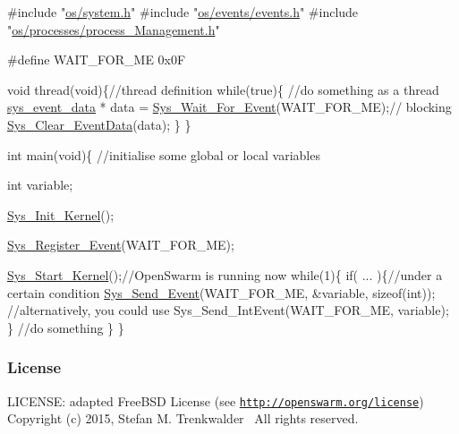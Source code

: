\begin{DoxyCode}
\textcolor{preprocessor}{#include "\hyperlink{system_8h}{os/system.h}"}
\textcolor{preprocessor}{#include "\hyperlink{events_8h}{os/events/events.h}"}
\textcolor{preprocessor}{#include "\hyperlink{process__Management_8h}{os/processes/process\_Management.h}"}

\textcolor{preprocessor}{#define WAIT\_FOR\_ME 0x0F}


\textcolor{keywordtype}{void} thread(\textcolor{keywordtype}{void})\{\textcolor{comment}{//thread definition}
      \textcolor{keywordflow}{while}(\textcolor{keyword}{true})\{
          \textcolor{comment}{//do something as a thread}
          \hyperlink{structsys__event__data}{sys\_event\_data} * data = \hyperlink{process__Management_8c_a4b45be80626e64bb659b16e5dabcfc1d}{Sys\_Wait\_For\_Event}(WAIT\_FOR\_ME);\textcolor{comment}{//
      blocking}
          \hyperlink{data_8c_a4ce23b19b4229d1d0ba38d45a9f36bf8}{Sys\_Clear\_EventData}(data);
      \}
\}

\textcolor{keywordtype}{int} main(\textcolor{keywordtype}{void})\{
 \textcolor{comment}{//initialise some global or local variables}

 \textcolor{keywordtype}{int} variable;

    \hyperlink{system_8c_a31ce626d506c2b262ecf5b23946f522f}{Sys\_Init\_Kernel}();

 \hyperlink{events_8c_a5d9657772509ddb7ac6f6e1aa5730308}{Sys\_Register\_Event}(WAIT\_FOR\_ME);
     
 \hyperlink{system_8c_a2e15518324643f26cb240108259b30da}{Sys\_Start\_Kernel}();\textcolor{comment}{//OpenSwarm is running now      }
    \textcolor{keywordflow}{while}(1)\{
     \textcolor{keywordflow}{if}( ... )\{\textcolor{comment}{//under a certain condition}
         \hyperlink{events_8c_a67230a5307e77a8112e56436f372926f}{Sys\_Send\_Event}(WAIT\_FOR\_ME, &variable, \textcolor{keyword}{sizeof}(\textcolor{keywordtype}{int}));
         \textcolor{comment}{//alternatively, you could use Sys\_Send\_IntEvent(WAIT\_FOR\_ME, variable);}
     \}
     \textcolor{comment}{//do something}
    \}
\}
\end{DoxyCode}
\hypertarget{group__process_process_license}{}\subsubsection{License}\label{group__process_process_license}
L\+I\+C\+E\+N\+S\+E\+: adapted Free\+B\+S\+D License (see \href{http://openswarm.org/license}{\tt http\+://openswarm.\+org/license})~\newline
Copyright (c) 2015, Stefan M. Trenkwalder~\newline
All rights reserved. 